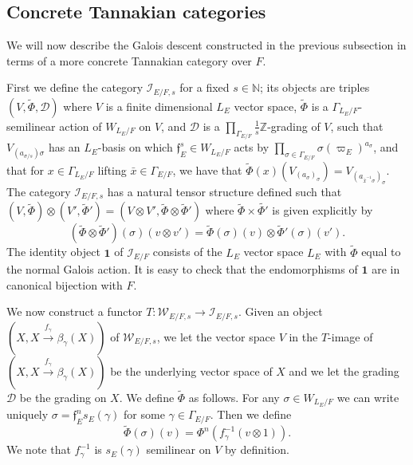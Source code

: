 \documentclass[11pt]{amsart}
\theoremstyle{definition}
\newcommand{\mc}{\mathcal}
\newcommand{\mb}{\mathbf}
\newcommand{\mf}{\mathfrak}
\begin{document}
\subsection{Concrete Tannakian categories}
We will now describe the Galois descent constructed in the previous subsection in terms of a more concrete Tannakian category over $F$.

First we define the category $\mc{I}_{E/F,s}$ for a fixed $s \in \mathbb{N}$; its objects are triples $(V, \tilde{\Phi},\mathcal{D})$ where $V$ is a finite dimensional $L_E$ vector space, $\tilde{\Phi}$ is a $\Gamma_{L_E/F}$-semilinear action of $W_{L_E/F}$ on $V$, and $\mathcal{D}$ is a $\prod_{\Gamma_{E/F}} \frac{1}{s}\mathbb{Z}$-grading of $V$, such that $V_{(a_{\sigma/s}){\sigma}}$ has an $L_{E}$-basis on which $\mf{f}_{E}^{s} \in W_{L_{E}/F}$ acts by $\prod\limits_{\sigma \in \Gamma_{E/F}} \sigma(\varpi_E)^{a_{\sigma}}$, and that for $x \in \Gamma_{L_E/F}$ lifting $\bar{x} \in \Gamma_{E/F}$, we have that $\tilde{\Phi}(x)(V_{(a_{\sigma})_{\sigma}}) = V_{(a_{\bar{x}^{-1}\sigma})_{\sigma}}$. The category $\mc{I}_{E/F,s}$ has a natural tensor structure defined such that $(V, \tilde{\Phi}) \otimes (V', \tilde{\Phi}') = (V \otimes V', \tilde{\Phi} \otimes \tilde{\Phi}')$ where $\tilde{\Phi} \times \tilde{\Phi'}$ is given explicitly by 
\begin{equation*}
    (\tilde{\Phi} \otimes \tilde{\Phi}')(\sigma)(v \otimes v') = \tilde{\Phi}(\sigma)(v) \otimes \tilde{\Phi}'(\sigma)(v').
\end{equation*}
The identity object $\mb{1}$ of $\mc{I}_{E/F}$ consists of the $L_E$ vector space $L_E$ with $\tilde{\Phi}$ equal to the normal Galois action. It is easy to check that the endomorphisms of $\mb{1}$ are in canonical bijection with $F$.

We now construct a functor $T: \mc{W}_{E/F,s} \to \mc{I}_{E/F,s}$. Given an object $(X, X \xrightarrow{f_{\gamma}} \beta_{\gamma}(X))$ of $\mc{W}_{E/F,s}$, we let the vector space $V$ in the $T$-image of $(X, X \xrightarrow{f_{\gamma}} \beta_{\gamma}(X))$ be the underlying vector space of $X$ and we let the grading $\mc{D}$ be the grading on $X$. We define $\tilde{\Phi}$ as follows. For any $\sigma \in W_{L_E/F}$ we can write uniquely $\sigma= \mf{f}_{E}^n s_E(\gamma)$ for some $\gamma \in \Gamma_{E/F}$. Then we define 
\begin{equation*}
    \tilde{\Phi}(\sigma)(v) =\Phi^n(f^{-1}_{\gamma}(v \otimes 1)).
\end{equation*}
We note that $f^{-1}_{\gamma}$ is $s_E(\gamma)$ semilinear on $V$ by definition.
\end{document}
